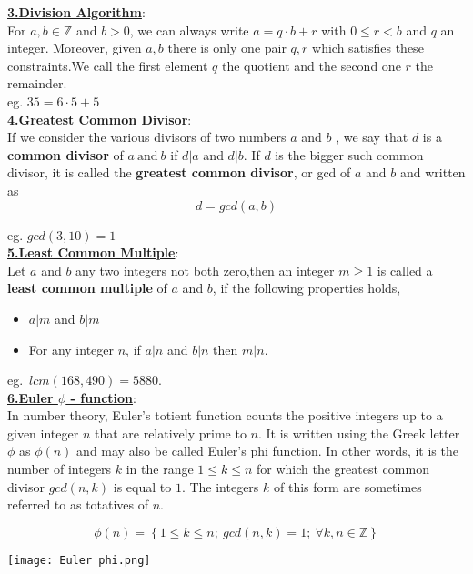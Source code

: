 \documentclass[12pt,a4paper]{article}
\begin{document}
        \pagebreak
    \begin{tcolorbox}
        \underline{\bf{3.Division Algorithm}}:\\
    
        For $a,b \in \mathbb{Z}$ and $b > 0$, we can always write $a = q\cdot b + r$ with $0\leq r < b$ and $q$ an integer. Moreover, given $a,b$ there is only one pair $q,r$ which satisfies these constraints.We call the first element $q$ the quotient and the second one $r$ the remainder.\\
    
        eg. $35 = 6\cdot 5 + 5$ \\
    
        \underline{\bf{4.Greatest Common Divisor}}:\\
    
        If we consider the various divisors of two numbers $a$ and $b$ , we say that $d$ is a {\bf common divisor} of $a\  \mbox{and}\ b$ if $d|a$ and $d|b$. If $d$ is the bigger such common divisor, it is called the {\bf greatest common divisor}, or gcd of $a$ and $b$ and written as
        $$d = gcd(a,b)$$
    
        eg.  $gcd(3,10) = 1$\\
    
        \underline{\bf{5.Least Common Multiple}}:\\
    
        Let $a$ and $b$ any two integers not both zero,then an integer $m\geq 1$ is called a {\bf least common multiple} of $a$ and $b$, if the following properties holds,
        \begin{itemize}
            \item $a|m$ and $b|m$
            \item For any integer $n$, if $a|n$ and $b|n$ then $m|n$.
        \end{itemize}
    
        eg.\ $lcm(168,490) = 5880.$\\
    
        \underline{\bf{6.Euler $\phi$ - function}}:\\
    
        In number theory, Euler's totient function counts the positive integers up to a given integer $n$ that are relatively prime to $n$. It is written using the Greek letter $\phi$ as $\phi(n)$ and may also be called Euler's phi function. In other words, it is the number of integers $k$ in the range $1 \leq k \leq n$ for which the greatest common divisor $gcd(n, k)$ is equal to $1$. The integers $k$ of this form are sometimes referred to as totatives of $n$.
    
        $$\phi(n) = \left\{1\leq k \leq n ;\ gcd(n,k) = 1 ;\ \forall k,n\in \mathbb{Z}\right\}$$
    
        \begin{center}
            \texttt{[image: Euler phi.png]}
        \end{center}
    \end{tcolorbox}

   
\end{document}
